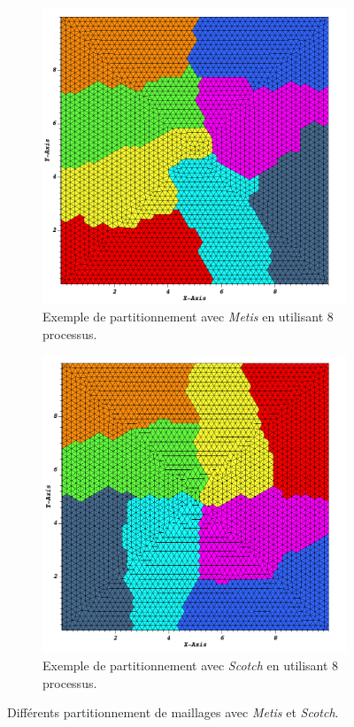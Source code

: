 \documentclass[a4paper,11pt]{article}
\begin{document}
\begin{figure}[H]
	\centering
	\begin{subfigure}{.45\textwidth}
		\centering
		\includegraphics[width=.8\linewidth]{figures/metis_part_8.png}
		\caption{Exemple de partitionnement avec \textit{Metis} en utilisant 8 processus.}
		\label{fig:metis_part_8}
	\end{subfigure}    
	\hfill
	\begin{subfigure}{.45\textwidth}
		\centering
		\includegraphics[width=.8\linewidth]{figures/scotch_part_8.png}
		\caption{Exemple de partitionnement avec \textit{Scotch} en utilisant 8 processus.}
		\label{fig:scotch_part_8}
	\end{subfigure}
	
	\caption{Différents partitionnement de maillages avec \textit{Metis} et \textit{Scotch}.}
	\label{fig:part_metis_scotch}
\end{figure}
\end{document}
